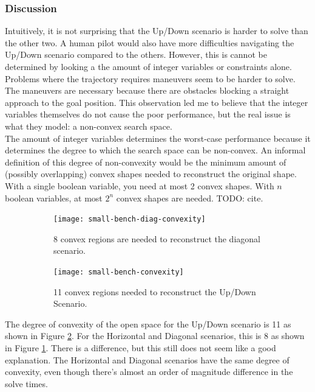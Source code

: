 \subsubsection{Discussion}
Intuitively, it is not surprising that the Up/Down scenario is harder to solve than the other two. A human pilot would also have more difficulties navigating the Up/Down scenario compared to the others. However, this is cannot be determined by looking a the amount of integer variables or constraints alone.\\
Problems where the trajectory requires maneuvers seem to be harder to solve. The maneuvers are necessary because there are obstacles blocking a straight approach to the goal position. This observation led me to believe that the integer variables themselves do not cause the poor performance, but the real issue is what they model: a non-convex search space.\\
The amount of integer variables determines the worst-case performance because it determines the degree to which the search space can be non-convex. An informal definition of this degree of non-convexity would be the minimum amount of (possibly overlapping) convex shapes needed to reconstruct the original shape. With a single boolean variable, you need at most 2 convex shapes. With $n$ boolean variables, at most $2^n$ convex shapes are needed. TODO: cite.\\
\begin{figure}
	\centering
	\begin{subfigure}[t]{0.47\columnwidth}
        		\texttt{[image: small-bench-diag-convexity]}
        		\caption{8 convex regions are needed to reconstruct the diagonal scenario.}
        		 \label{fig:convex-diag-convexity}
	\end{subfigure}	
	\hfill
	\begin{subfigure}[t]{0.47\columnwidth}
        		\texttt{[image: small-bench-convexity]}
        		\caption{11 convex regions needed to reconstruct the Up/Down Scenario.}
        		 \label{fig:convex-full-convexity}
	\end{subfigure}	
    \caption{}
    \label{fig:benchmarks-convex}     
\end{figure}
The degree of convexity of the open space for the Up/Down scenario is 11 as shown in Figure \ref{fig:convex-full-convexity}. For the Horizontal and Diagonal scenarios, this is 8 as shown in Figure \ref{fig:convex-diag-convexity}. There is a difference, but this still does not seem like a good explanation. The Horizontal and Diagonal scenarios have the same degree of convexity, even though there's almost an order of magnitude difference in the solve times. \\
